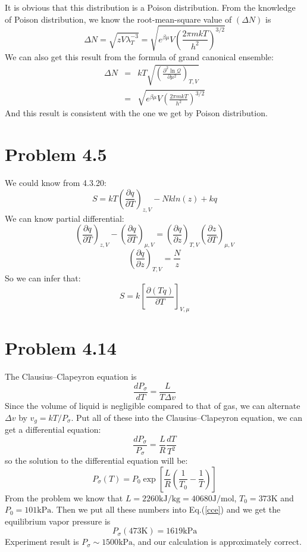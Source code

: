 \documentclass{article}
\begin{document}
It is obvious that this distribution is a Poison distribution. From the knowledge of Poison distribution, we know the root-mean-square value of $(\Delta N)$ is
\begin{equation}
\Delta N = \sqrt{zV\lambda_T^{-3}}=\sqrt{e^{\beta\mu}V\left(\frac{2\pi mkT}{h^2}\right)^{3/2}}
\end{equation}
We can also get this result from the formula of grand canonical ensemble:
\begin{eqnarray}
\Delta N &=&kT\sqrt{ \left(\frac{\partial^2 \ln\mathcal{Q}}{\partial\mu^2}\right)_{T,V}}\nonumber\\
&=&\sqrt{e^{\beta\mu}V\left(\frac{2\pi mkT}{h^2}\right)^{3/2}}
\end{eqnarray}
And this result is consistent with the one we get by Poison distribution.

\section*{Problem 4.5} %
\label{sec:problem_4_5}
	
	We could know from 4.3.20:
	$$S=kT(\frac{\partial q}{\partial T})_{z,V}-Nkln(z)+kq$$
	We can know partial differential:
	$$(\frac{\partial q}{\partial T})_{z,V}-(\frac{\partial q}{\partial T})_{\mu,V}=(\frac{\partial q}{\partial z})_{T,V}(\frac{\partial z}{\partial T})_{\mu,V}$$
	$$(\frac{\partial q}{\partial z})_{T,V}=\frac{N}{z}$$
	So we can infer that:
	$$S=k[\frac{\partial (Tq)}{\partial{T}}]_{V,\mu}$$

\section*{Problem 4.14}
The Clausius–Clapeyron equation is
$$
\frac{dP_\sigma}{dT} = \frac{L}{T\Delta v}
$$
Since the volume of liquid is negligible compared to that of gas, we can alternate $\Delta v$ by $v_g = kT/P_\sigma$. Put all of these into the Clausius–Clapeyron equation, we can get a differential equation:
\begin{equation}
\frac{dP_\sigma}{P_\sigma} = \frac{L}{R}\frac{dT}{T^2}
\end{equation}
so the solution to the differential equation will be:
\begin{equation}\label{cce}
P_\sigma(T) = P_0\exp\left[\frac{L}{R}\left(\frac{1}{T_0}-\frac{1}{T}\right)\right]
\end{equation}
From the problem we know that $L = 2260\mathrm{kJ/kg} = 40680\mathrm{J/mol}$, $T_0 =373\mathrm{K}$ and $P_0 = 101\mathrm{kPa}$. Then we put all these numbers into Eq.(\ref{cce}) and we get the equilibrium vapor pressure is
$$
P_\sigma(473\mathrm{K}) = 1619\mathrm{kPa}
$$
Experiment result is $P_\sigma \sim 1500\mathrm{kPa}$, and our calculation is approximately correct.
\end{document}
